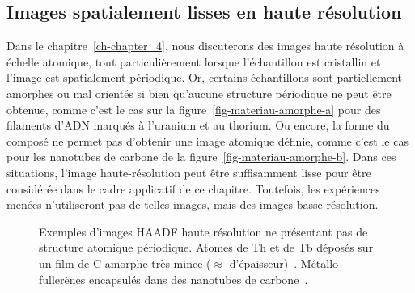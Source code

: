 \subsection{Images spatialement lisses en haute résolution}

Dans le chapitre~\ref{ch-chapter_4}, nous discuterons des images haute résolution à échelle atomique, tout particulièrement lorsque l'échantillon est cristallin et l'image est spatialement périodique.
%
Or, certains échantillons sont partiellement amorphes ou mal orientés si bien qu'aucune structure périodique ne peut être obtenue, comme c'est le cas sur la figure~\ref{fig-materiau-amorphe-a} pour des filaments d'ADN marqués à l'uranium et au thorium.
%
Ou encore, la forme du composé ne permet pas d'obtenir une image atomique définie, comme c'est le cas pour les nanotubes de carbone de la figure~\ref{fig-materiau-amorphe-b}.
%
Dans ces situations, l'image haute-résolution peut être suffisamment lisse pour être considérée dans le cadre applicatif de ce chapitre. Toutefois, les expériences menées n'utiliseront pas de telles images, mais des images basse résolution.  

\begin{figure}[h]
    \centering
    \hspace{1em}
    \caption{Exemples d’images HAADF haute résolution ne présentant pas de structure atomique périodique. 
        \protect{} Atomes de Th et de Tb déposés sur un film de C amorphe très mince ($\approx$  d'épaisseur)~\cite{march2014adressing}.
        \protect{} Métallo-fullerènes encapsulés dans des nanotubes de carbone~\cite{colliex2012capturing}.
        \protect\label{fig-materiau-amorphe}}
\end{figure}


